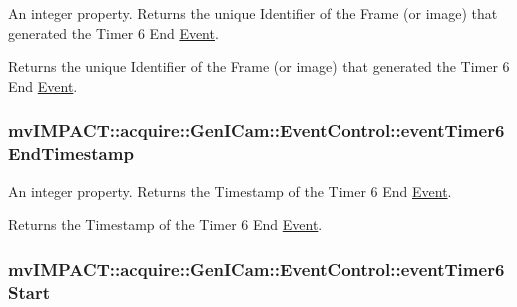 An integer property. Returns the unique Identifier of the Frame (or image) that generated the Timer 6 End \hyperlink{classmv_i_m_p_a_c_t_1_1acquire_1_1_event}{Event}. 

Returns the unique Identifier of the Frame (or image) that generated the Timer 6 End \hyperlink{classmv_i_m_p_a_c_t_1_1acquire_1_1_event}{Event}. \hypertarget{classmv_i_m_p_a_c_t_1_1acquire_1_1_gen_i_cam_1_1_event_control_a64c6ded7ea7be2e5c1d4012f5dd38f0b}{
\subsubsection[{event\+Timer6\+End\+Timestamp}]{ mv\+I\+M\+P\+A\+C\+T\+::acquire\+::\+Gen\+I\+Cam\+::\+Event\+Control\+::event\+Timer6\+End\+Timestamp}}\label{classmv_i_m_p_a_c_t_1_1acquire_1_1_gen_i_cam_1_1_event_control_a64c6ded7ea7be2e5c1d4012f5dd38f0b}


An integer property. Returns the Timestamp of the Timer 6 End \hyperlink{classmv_i_m_p_a_c_t_1_1acquire_1_1_event}{Event}. 

Returns the Timestamp of the Timer 6 End \hyperlink{classmv_i_m_p_a_c_t_1_1acquire_1_1_event}{Event}. \hypertarget{classmv_i_m_p_a_c_t_1_1acquire_1_1_gen_i_cam_1_1_event_control_ade3a2787878740154a0379950eab3f63}{
\subsubsection[{event\+Timer6\+Start}]{ mv\+I\+M\+P\+A\+C\+T\+::acquire\+::\+Gen\+I\+Cam\+::\+Event\+Control\+::event\+Timer6\+Start}}\label{classmv_i_m_p_a_c_t_1_1acquire_1_1_gen_i_cam_1_1_event_control_ade3a2787878740154a0379950eab3f63}


